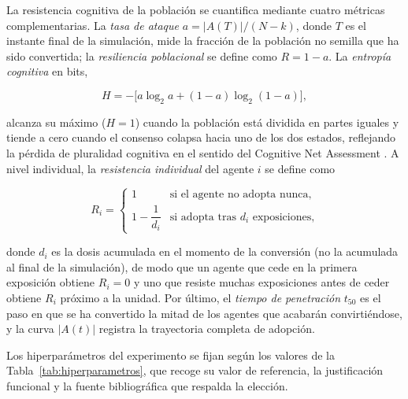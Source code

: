 \medskip

La resistencia cognitiva de la población se cuantifica mediante cuatro métricas complementarias. La \emph{tasa de ataque} $a = |A(T)| / (N - k)$, donde $T$ es el instante final de la simulación, mide la fracción de la población no semilla que ha sido convertida; la \emph{resiliencia poblacional} se define como $R = 1 - a$. La \emph{entropía cognitiva} en bits,

\begin{equation}
  \label{eq:entropia}
  H = -\bigl[a \log_2 a + (1 - a) \log_2 (1 - a)\bigr],
\end{equation}

\noindent alcanza su máximo ($H = 1$) cuando la población está dividida en partes iguales y tiende a cero cuando el consenso colapsa hacia uno de los dos estados, reflejando la pérdida de pluralidad cognitiva en el sentido del Cognitive Net Assessment \cite{PolytechniqueCNA2026}. A nivel individual, la \emph{resistencia individual} del agente $i$ se define como

\begin{equation}
  \label{eq:Ri}
  R_i =
  \begin{cases}
    1 & \text{si el agente no adopta nunca,}\\[4pt]
    1 - \dfrac{1}{d_i} & \text{si adopta tras } d_i \text{ exposiciones,}
  \end{cases}
\end{equation}

\noindent donde $d_i$ es la dosis acumulada en el momento de la conversión (no la acumulada al final de la simulación), de modo que un agente que cede en la primera exposición obtiene $R_i = 0$ y uno que resiste muchas exposiciones antes de ceder obtiene $R_i$ próximo a la unidad. Por último, el \emph{tiempo de penetración} $t_{50}$ es el paso en que se ha convertido la mitad de los agentes que acabarán convirtiéndose, y la curva $|A(t)|$ registra la trayectoria completa de adopción.

\medskip

Los hiperparámetros del experimento se fijan según los valores de la Tabla~\ref{tab:hiperparametros}, que recoge su valor de referencia, la justificación funcional y la fuente bibliográfica que respalda la elección.

